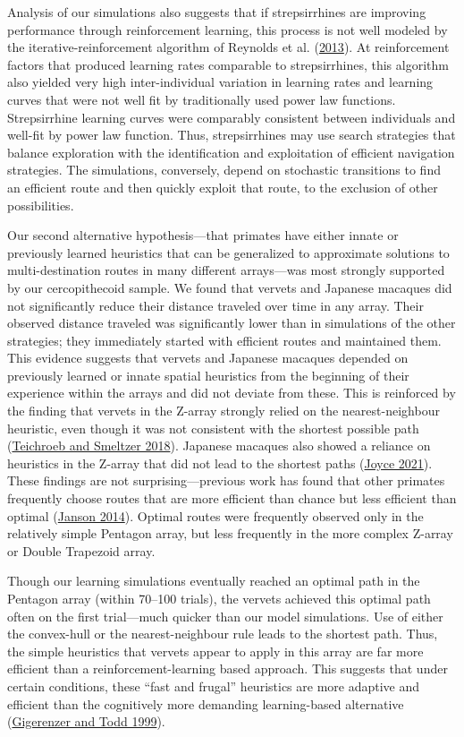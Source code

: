 \documentclass[twoside,12pt,final]{ucthesis-CA2012}
\begin{document}
\begin{ucmainmatter}
Analysis of our simulations also suggests that if strepsirrhines are improving performance through reinforcement learning, this process is not well modeled by the iterative-reinforcement algorithm of Reynolds et al. (\protect\hyperlink{ref-reynolds2013}{2013}). At reinforcement factors that produced learning rates comparable to strepsirrhines, this algorithm also yielded very high inter-individual variation in learning rates and learning curves that were not well fit by traditionally used power law functions. Strepsirrhine learning curves were comparably consistent between individuals and well-fit by power law function. Thus, strepsirrhines may use search strategies that balance exploration with the identification and exploitation of efficient navigation strategies. The simulations, conversely, depend on stochastic transitions to find an efficient route and then quickly exploit that route, to the exclusion of other possibilities.

Our second alternative hypothesis---that primates have either innate or previously learned heuristics that can be generalized to approximate solutions to multi-destination routes in many different arrays---was most strongly supported by our cercopithecoid sample. We found that vervets and Japanese macaques did not significantly reduce their distance traveled over time in any array. Their observed distance traveled was significantly lower than in simulations of the other strategies; they immediately started with efficient routes and maintained them. This evidence suggests that vervets and Japanese macaques depended on previously learned or innate spatial heuristics from the beginning of their experience within the arrays and did not deviate from these. This is reinforced by the finding that vervets in the Z-array strongly relied on the nearest-neighbour heuristic, even though it was not consistent with the shortest possible path (\protect\hyperlink{ref-teichroeb2018}{Teichroeb and Smeltzer 2018}). Japanese macaques also showed a reliance on heuristics in the Z-array that did not lead to the shortest paths (\protect\hyperlink{ref-joyce2021}{Joyce 2021}). These findings are not surprising---previous work has found that other primates frequently choose routes that are more efficient than chance but less efficient than optimal (\protect\hyperlink{ref-janson2014}{Janson 2014}). Optimal routes were frequently observed only in the relatively simple Pentagon array, but less frequently in the more complex Z-array or Double Trapezoid array.

Though our learning simulations eventually reached an optimal path in the Pentagon array (within 70--100 trials), the vervets achieved this optimal path often on the first trial---much quicker than our model simulations. Use of either the convex-hull or the nearest-neighbour rule leads to the shortest path. Thus, the simple heuristics that vervets appear to apply in this array are far more efficient than a reinforcement-learning based approach. This suggests that under certain conditions, these ``fast and frugal'' heuristics are more adaptive and efficient than the cognitively more demanding learning-based alternative (\protect\hyperlink{ref-gigerenzer1999}{Gigerenzer and Todd 1999}).


\end{ucmainmatter}
\end{document}
